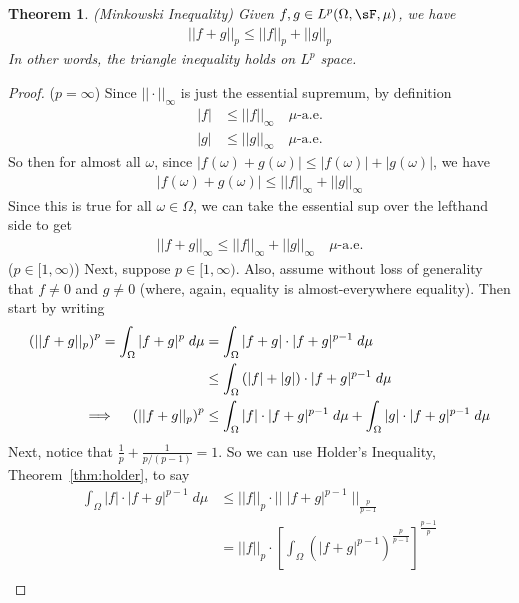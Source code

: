 \documentclass[12pt]{article}
\theoremstyle{plain}
\newtheorem{thm}{Theorem}[section]
\theoremstyle{definition}
\theoremstyle{remark}
\begin{document}
\begin{thm}\emph{(Minkowski Inequality)}
\label{thm:minkowski}
Given $f,g \in L^p(\Omega,\sF,\mu)$, we have
\begin{align*}
  ||f+g||_p \leq ||f||_p + ||g||_p
\end{align*}
In other words, the triangle inequality holds on $L^p$ space.
\end{thm}
\begin{proof}
($p=\infty$)
Since $|| \cdot||_\infty$ is just the essential supremum, by definition
\begin{align*}
    |f|&\leq || f||_\infty
    \quad \text{$\mu$-a.e.}\\
    |g|&\leq || g||_\infty
    \quad \text{$\mu$-a.e.}
\end{align*}
So then for almost all $\omega$, since
$|f(\omega)+g(\omega)|\leq |f(\omega)|+|g(\omega)|$, we have
\begin{align*}
    |f(\omega)+g(\omega)|\leq || f||_\infty
    + || g||_\infty
\end{align*}
Since this is true for all $\omega\in\Omega$, we can take the essential
sup over the lefthand side to get
\begin{align*}
    || f+g||_\infty
    \leq || f||_\infty
    + || g||_\infty
    \quad \text{$\mu$-a.e.}
\end{align*}
($p\in[1,\infty)$)
Next, suppose $p\in[1,\infty)$. Also, assume without loss of
generality that $f\neq 0$ and $g\neq 0$ (where, again, equality is
almost-everywhere equality).
Then start by writing
\begin{align}
  \left(||f+g||_p\right)^p
  = \int_\Omega |f+g|^p \; d\mu
  &= \int_\Omega |f+g| \cdot |f+g|^{p-1}\; d\mu \notag \\
  &\leq
  \int_\Omega \left(|f|+|g| \right)\cdot |f+g|^{p-1}\; d\mu \notag\\
  \implies\quad
  \left(||f+g||_p\right)^p
  &\leq
  \int_\Omega |f|\cdot |f+g|^{p-1}\; d\mu
  +
  \int_\Omega |g| \cdot |f+g|^{p-1}\; d\mu
  \label{fplusg}
\end{align}
Next, notice that $\frac{1}{p} +\frac{1}{p/(p-1)}=1$. So we can use
Holder's Inequality, Theorem~\ref{thm:holder}, to say
\begin{align*}
  \int_\Omega |f|\cdot |f+g|^{p-1}\; d\mu
  &\leq
  ||f||_p \cdot
  \big|\big|\;|f+g|^{p-1}\;\big|\big|_{\frac{p}{p-1}} \\
  &=
  ||f||_p \cdot
  \left[
    \int_\Omega \left(|f+g|^{p-1}\right)^\frac{p}{p-1}
  \right]^\frac{p-1}{p} \\

\end{align*}
\end{proof}
\end{document}
